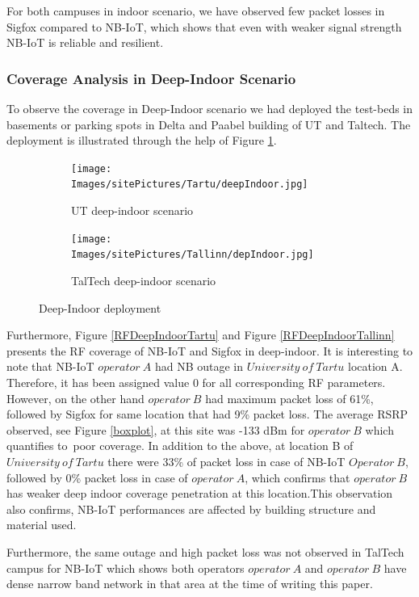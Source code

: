 \documentclass[12pt]{article}
\begin{document}
For both campuses in indoor scenario, we have observed few packet losses in Sigfox compared to NB-IoT, which shows that even with weaker signal strength NB-IoT is reliable and resilient.\par

\subsubsection{Coverage Analysis in Deep-Indoor Scenario} \label{deep-indoor analysis}
To observe the coverage in Deep-Indoor scenario we had deployed the test-beds in basements or parking spots in Delta and Paabel building of UT and Taltech. The deployment is illustrated through the help of Figure \ref{fig:Deep-Indoor deployment}.

\begin{figure}[H]
\centering
\begin{subfigure}[t]{0.42 \columnwidth}
  \centering
  \texttt{[image: Images/sitePictures/Tartu/deepIndoor.jpg]}
  \caption{UT deep-indoor scenario}
  \end{subfigure}
  
  \begin{subfigure}[t]{0.42 \columnwidth}
    \centering
    \texttt{[image: Images/sitePictures/Tallinn/depIndoor.jpg]}
    \caption{TalTech deep-indoor scenario}
  \end{subfigure}
   
    \caption{Deep-Indoor deployment}
    \label{fig:Deep-Indoor deployment}
\end{figure}

Furthermore, Figure \ref{RFDeepIndoorTartu} and Figure \ref{RFDeepIndoorTallinn} presents the RF coverage of NB-IoT and Sigfox in deep-indoor. It is interesting to note that NB-IoT $operator\ A$ had NB outage in $University\ of\ Tartu$ location A. Therefore, it has been assigned value 0 for all corresponding RF parameters. However, on the other hand $operator\ B$ had maximum packet loss of 61\%, followed by Sigfox for same location that had 9\% packet loss. The average RSRP observed, see Figure \ref{boxplot}, at this site was -133 dBm for $operator\ B$ which quantifies to\ poor coverage. In addition to the above, at location B of $University\ of\ Tartu$ there were 33\% of packet loss in case of NB-IoT $Operator\ B$, followed by 0\% packet loss in case of $operator\  A$, which confirms that $operator\ B$ has weaker deep indoor coverage penetration at this location.This observation also confirms, NB-IoT performances are affected by building structure and material used.\par
Furthermore, the same outage and high packet loss was not observed in TalTech campus for NB-IoT which shows both operators $operator\ A$ and $operator\ B$ have dense narrow band network in that area at the time of writing this paper.
\end{document}
